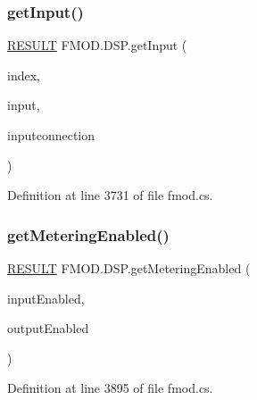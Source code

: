 \subsubsection{\texorpdfstring{get\+Input()}{getInput()}}
{\footnotesize\ttfamily \hyperlink{namespace_f_m_o_d_a305d1176ef3f8c8815861a60407ac33d}{R\+E\+S\+U\+LT} F\+M\+O\+D.\+D\+S\+P.\+get\+Input (\begin{DoxyParamCaption}\item[{int}]{index,  }\item[{out \hyperlink{class_f_m_o_d_1_1_d_s_p}{D\+SP}}]{input,  }\item[{out \hyperlink{class_f_m_o_d_1_1_d_s_p_connection}{D\+S\+P\+Connection}}]{inputconnection }\end{DoxyParamCaption})}



Definition at line 3731 of file fmod.\+cs.

\mbox{\label{class_f_m_o_d_1_1_d_s_p_a1e6600f84abe122d30f3f708b41dd24e}} 
\subsubsection{\texorpdfstring{get\+Metering\+Enabled()}{getMeteringEnabled()}}
{\footnotesize\ttfamily \hyperlink{namespace_f_m_o_d_a305d1176ef3f8c8815861a60407ac33d}{R\+E\+S\+U\+LT} F\+M\+O\+D.\+D\+S\+P.\+get\+Metering\+Enabled (\begin{DoxyParamCaption}\item[{out bool}]{input\+Enabled,  }\item[{out bool}]{output\+Enabled }\end{DoxyParamCaption})}



Definition at line 3895 of file fmod.\+cs.

\mbox{\label{class_f_m_o_d_1_1_d_s_p_a1af8bff7095c5f0abd05ac96a4c71c29}} 
